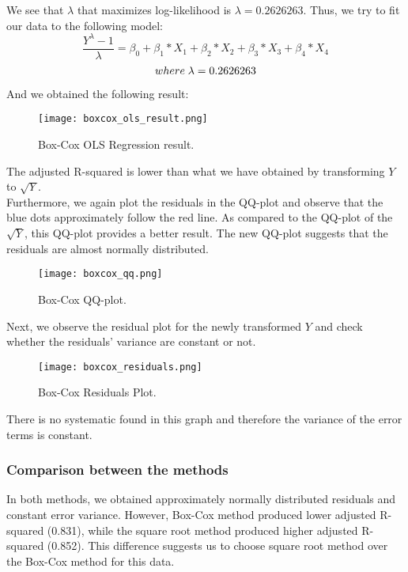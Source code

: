 \documentclass[english]{article}
\begin{document}
We see that $\lambda$ that maximizes log-likelihood is $\lambda = 0.2626263$. Thus, we try to fit our data to the following model: 
$$ \frac{Y^\lambda-1}{\lambda} = \beta_0 + \beta_1 * X_{1} + \beta_2 * X_{2} + \beta_3 * X_{3} + \beta_4 * X_{4}$$
$$where \thickspace \lambda=0.2626263 $$

And we obtained the following result: 
\begin{figure}[H]
	\begin{centering}
  		\texttt{[image: boxcox\_ols\_result.png]}
  		\caption{Box-Cox OLS Regression result.\label{boxcox_ols}
}
	\end{centering}
\end{figure}

The adjusted R-squared is lower than what we have obtained by transforming $Y$ to $\sqrt{Y}$. \\
Furthermore, we again plot the residuals in the QQ-plot and observe that the blue dots approximately follow the red line. As compared to the QQ-plot of the $\sqrt{Y}$, this QQ-plot provides a better result. The new QQ-plot suggests that the residuals are almost normally distributed. 
\begin{figure}[H]
	\begin{centering}
  		\texttt{[image: boxcox\_qq.png]}
  		\caption{Box-Cox QQ-plot.\label{boxcox_qq}
}
	\end{centering}
\end{figure}

Next, we observe the residual plot for the newly transformed $Y$ and check whether the residuals' variance are constant or not.
\begin{figure}[H]
	\begin{centering}
  		\texttt{[image: boxcox\_residuals.png]}
  		\caption{Box-Cox Residuals Plot.\label{boxcox_residuals}
}
	\end{centering}
\end{figure}
There is no systematic found in this graph and therefore the variance of the error terms is constant. \\

\subsubsection{Comparison between the methods}
In both methods, we obtained approximately normally distributed residuals and constant error variance. However, Box-Cox method produced lower adjusted R-squared (0.831), while the square root method produced higher adjusted R-squared (0.852). This difference suggests us to choose square root method over the Box-Cox method for this data. 
\end{document}
